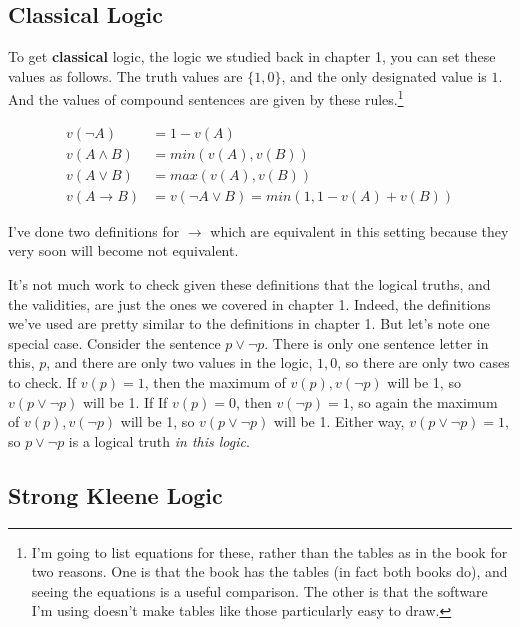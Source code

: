 \documentclass[
]{article}
\begin{document}
\hypertarget{classical-logic}{%
\subsection{Classical Logic}\label{classical-logic}}

To get \textbf{classical} logic, the logic we studied back in chapter 1,
you can set these values as follows. The truth values are \(\{1,0\}\),
and the only designated value is \(1\). And the values of compound
sentences are given by these rules.\footnote{I'm going to list equations
  for these, rather than the tables as in the book for two reasons. One
  is that the book has the tables (in fact both books do), and seeing
  the equations is a useful comparison. The other is that the software
  I'm using doesn't make tables like those particularly easy to draw.}

\begin{align*}
v(\neg A) &= 1 - v(A) \\
v(A \wedge B) &= min(v(A), v(B)) \\
v(A \vee B) &= max(v(A), v(B)) \\
v(A \rightarrow B) &= v(\neg A \vee B) = min(1, 1 - v(A) + v(B)) 
\end{align*}

I've done two definitions for \(\rightarrow\) which are equivalent in
this setting because they very soon will become not equivalent.

It's not much work to check given these definitions that the logical
truths, and the validities, are just the ones we covered in chapter 1.
Indeed, the definitions we've used are pretty similar to the definitions
in chapter 1. But let's note one special case. Consider the sentence
\(p \vee \neg p\). There is only one sentence letter in this, \(p\), and
there are only two values in the logic, \(1, 0\), so there are only two
cases to check. If \(v(p) = 1\), then the maximum of \(v(p), v(\neg p)\)
will be 1, so \(v(p \vee \neg p)\) will be 1. If If \(v(p) = 0\), then
\(v(\neg p) = 1\), so again the maximum of \(v(p), v(\neg p)\) will be
1, so \(v(p \vee \neg p)\) will be 1. Either way,
\(v(p \vee \neg p) = 1\), so \(p \vee \neg p\) is a logical truth
\emph{in this logic}.

\hypertarget{strong-kleene-logic}{%
\subsection{Strong Kleene Logic}\label{strong-kleene-logic}}
\end{document}
